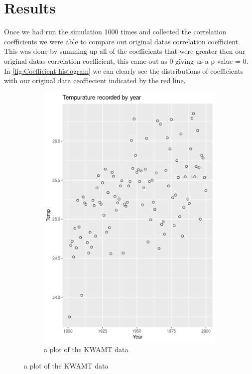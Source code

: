 \documentclass{article}
\begin{document}
\section{Results}
Once we had run the simulation 1000 times and collected the correlation coefficients we were able to compare out original datas correlation coefficient. This was done by summing up all of the coefficients that were greater then our original datas correlation coefficient, this came out as 0 giving us a p-value = 0. In \ref{fig:Coefficient histogram} we can clearly see the distributions of coefficients with our original data ceoffiecient indicated by the red line.
\begin{figure}[htp]
    \centering 
    \begin{subfigure}[b]{0.4\textwidth}
        \includegraphics[width=\textwidth]{TempByYear.png}
         \caption{a plot of the KWAMT data}

\end{subfigure}
\end{figure}
\end{document}
